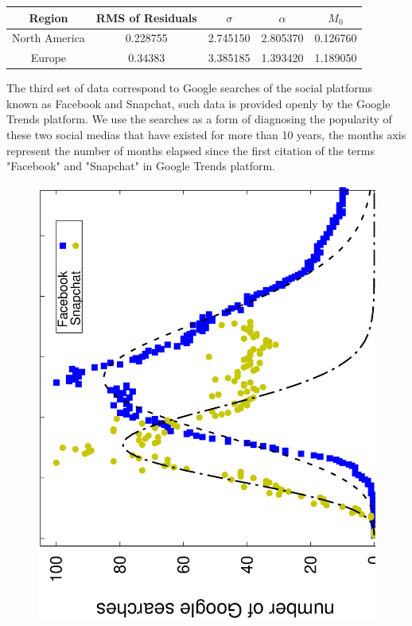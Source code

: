 \begin{table}[H]
\begin{tabular}{|c c c c c|}
\hline
Region & RMS of Residuals & $\sigma$ & $\alpha$ & $M_{0}$ \\ \hline
North America & 0.228755  & 2.745150 & 2.805370  & 0.126760 \\ \hline
Europe        & 0.34383 & 3.385185 & 1.393420  & 1.189050 \\ \hline
\end{tabular}
\end{table}

The third set of data correspond to Google searches of the social platforms known as Facebook and Snapchat, such data is provided openly by the Google Trends platform. We use the searches as a form of diagnosing the popularity of these two social medias that have existed for more than 10 years, the months axis represent the number of months elapsed since the first citation of the terms "Facebook" and "Snapchat" in Google Trends platform.

\begin{figure}[H]
    \centering\includegraphics[scale=0.35, angle=270]{figs/google_trends.eps}
    \caption{}
    \label{fig:social_media}
\end{figure}

